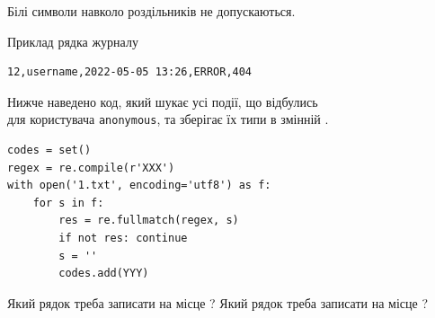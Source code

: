 \documentclass[12pt, ukrainian]{article}
\def\code#1{\Verb!#1!}
\begin{document}
{Білі символи навколо роздільників не допускаються.

Приклад рядка журналу



\begin{verbatim}
12,username,2022-05-05 13:26,ERROR,404
\end{verbatim}


Нижче наведено код, який шукає усі події, що відбулись\\ для користувача \code{anonymous}, та зберігає їх типи в змінній .



\begin{verbatim}
codes = set()
regex = re.compile(r'XXX')
with open('1.txt', encoding='utf8') as f:
    for s in f:
        res = re.fullmatch(regex, s)
        if not res: continue
        s = ''
        codes.add(YYY)
\end{verbatim}



Який рядок треба записати на місце  ?
Який рядок треба записати на місце  ?\par

}
\newpage
\end{document}
